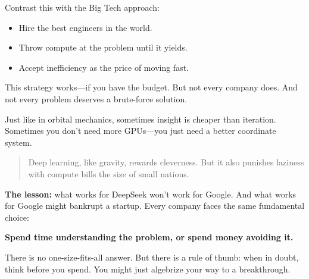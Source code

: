 Contrast this with the Big Tech approach:

\begin{itemize}
  \item Hire the best engineers in the world.
  \item Throw compute at the problem until it yields.
  \item Accept inefficiency as the price of moving fast.
\end{itemize}

This strategy works—if you have the budget. But not every company does. And not every problem deserves a brute-force solution.

Just like in orbital mechanics, sometimes insight is cheaper than iteration. Sometimes you don’t need more GPUs—you just need a better coordinate system.

\begin{quote}
Deep learning, like gravity, rewards cleverness. But it also punishes laziness with compute bills the size of small nations.
\end{quote}

\textbf{The lesson:} what works for DeepSeek won’t work for Google. And what works for Google might bankrupt a startup. Every company faces the same fundamental choice:

\begin{center}
\textbf{Spend time understanding the problem, or spend money avoiding it.}
\end{center}

There is no one-size-fits-all answer. But there is a rule of thumb: when in doubt, think before you spend. You might just algebrize your way to a breakthrough.


